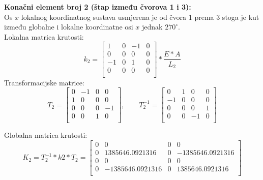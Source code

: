 \documentclass[a4paper,twoside,12pt]{memoir} %
\begin{document}
\textbf{Konačni element broj 2 (štap između čvorova 1 i 3):} \\
Os $x$ lokalnog koordinatnog sustava usmjerena je od čvora 1 prema 3 stoga je kut između globalne i lokalne koordinatne osi $x$ jednak $270^\circ$. \\
Lokalna matrica krutosti:
\begin{equation}
    k_2 = 
    \begin{bmatrix}
    1 & 0 & -1 & 0 \\
    0 & 0 & 0 & 0 \\
    -1 & 0 & 1 & 0 \\
    0 & 0 & 0 & 0 \\
    \end{bmatrix} * \frac{E * A}{L_2}
\end{equation}
Transformacijske matrice:
\begin{equation}
    T_2 =
    \begin{bmatrix}
    0 & -1 & 0 & 0 \\
    1 & 0 & 0 & 0 \\
    0 & 0 & 0 & -1 \\
    0 & 0 & 1 & 0 \\
    \end{bmatrix}, \qquad
    T^{-1}_2 =
    \begin{bmatrix}
    0 & 1 & 0 & 0 \\
    -1 & 0 & 0 & 0 \\
    0 & 0 & 0 & 1 \\
    0 & 0 & -1 & 0 \\
    \end{bmatrix}
\end{equation}

Globalna matrica krutosti:
\begin{equation}
    K_2 = T^{-1}_2 * k2 * T_2 =
    \begin{bmatrix}
    0 & 0 & 0 & 0 \\
    0 & 1385646.0921316 & 0 & -1385646.0921316 \\
    0 & 0 & 0 & 0 \\
    0 & -1385646.0921316 & 0 & 1385646.0921316 \\
    \end{bmatrix}
\end{equation}
\end{document}
